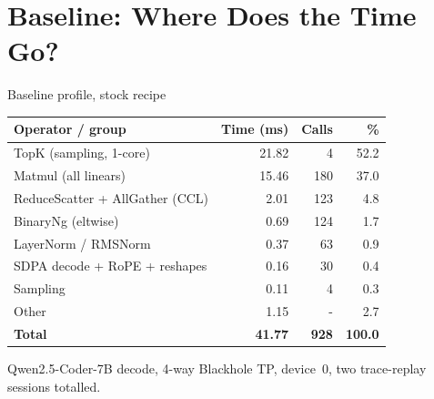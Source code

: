 \documentclass[aspectratio=169,10pt]{beamer}
\begin{document}
\section{Baseline: Where Does the Time Go?}

\begin{frame}{Baseline profile, stock recipe}
  \small
  \centering
  \begin{tabular}{lrrr}
    \toprule
    Operator / group & Time (ms) & Calls & \% \\
    \midrule
    \alert{TopK (sampling, 1-core)}    & 21.82 &   4 & \alert{52.2} \\
    \alert{Matmul (all linears)}       & 15.46 & 180 & \alert{37.0} \\
    ReduceScatter + AllGather (CCL)    &  2.01 & 123 &  4.8 \\
    BinaryNg (eltwise)                 &  0.69 & 124 &  1.7 \\
    LayerNorm / RMSNorm                &  0.37 &  63 &  0.9 \\
    SDPA decode + RoPE + reshapes      &  0.16 &  30 &  0.4 \\
    Sampling                           &  0.11 &   4 &  0.3 \\
    Other                              &  1.15 &  -  &  2.7 \\
    \midrule
    \textbf{Total}                     & \textbf{41.77} & \textbf{928} & \textbf{100.0} \\
    \bottomrule
  \end{tabular}
  \vfill
  Qwen2.5-Coder-7B decode, 4-way Blackhole TP, device~0, two trace-replay
  sessions totalled.
\end{frame}
\end{document}
